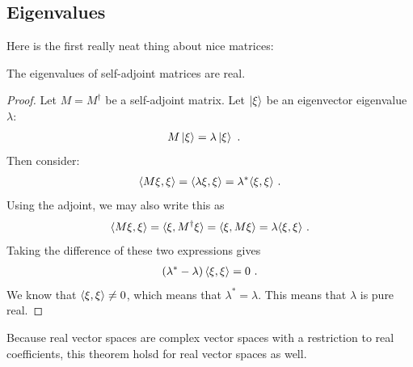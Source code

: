 



\subsection{Eigenvalues}

Here is the first really neat thing about nice matrices:
\begin{theorem}
The eigenvalues of self-adjoint matrices are real.
\end{theorem}
\begin{proof}
Let $M=M^\dag$ be a self-adjoint matrix. Let $\left|\xi\right\rangle$ be  an eigenvector eigenvalue $\lambda$:
\begin{align}
    M\left|\xi\right\rangle &= \lambda\left|\xi\right\rangle 
    \ .
\end{align}
Then consider:
\begin{align}
    \langle M \xi, \xi \rangle 
    = 
    \langle \lambda \xi, \xi \rangle
    = 
    \lambda^* \langle \xi, \xi \rangle \ .
\end{align}
Using the adjoint, we may also write this as
\begin{align}
    \langle M \xi, \xi \rangle 
    = 
    \langle \xi, M^\dag \xi \rangle
    =
    \langle \xi, M \xi \rangle
    = 
    \lambda \langle \xi, \xi \rangle \ .
\end{align}
Taking the difference of these two expressions gives
\begin{align}
    \left(\lambda^*-\lambda\right) \langle \xi, \xi \rangle  = 0 \ .
\end{align}
We know that $ \langle \xi, \xi \rangle\neq 0$, which means that $\lambda^* = \lambda$. This means that $\lambda$ is pure real. 
\end{proof}
Because real vector spaces are complex vector spaces with  a restriction to real coefficients, this theorem holsd for real vector spaces as well. 

